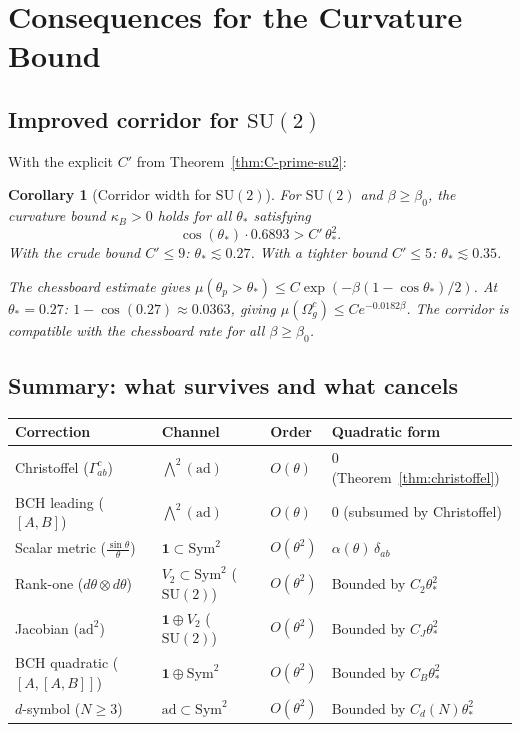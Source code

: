 \documentclass[11pt,a4paper]{article}
\theoremstyle{plain}
\newtheorem{corollary}[theorem]{Corollary}
\theoremstyle{definition}
\theoremstyle{remark}
\newcommand{\SU}{\mathrm{SU}}
\newcommand{\ad}{\mathrm{ad}}
\newcommand{\Sym}{\mathrm{Sym}}
\begin{document}
\section{Consequences for the Curvature Bound}\label{sec:applications}

\subsection{Improved corridor for $\SU(2)$}

With the explicit $C'$ from Theorem~\ref{thm:C-prime-su2}:

\begin{corollary}[Corridor width for $\SU(2)$]\label{cor:corridor-su2}
For $\SU(2)$ and $\beta \geq \beta_0$, the curvature bound
$\kappa_B > 0$ holds for all $\theta_*$ satisfying
\begin{equation}
\cos(\theta_*)\cdot 0.6893 > C'\,\theta_*^2.
\end{equation}
With the crude bound $C' \leq 9$: $\theta_* \lesssim 0.27$.
With a tighter bound $C' \leq 5$: $\theta_* \lesssim 0.35$.

The chessboard estimate gives
$\mu(\theta_p > \theta_*) \leq C\exp(-\beta(1-\cos\theta_*)/2)$.
At $\theta_* = 0.27$: $1 - \cos(0.27) \approx 0.0363$, giving
$\mu(\Omega_g^c) \leq Ce^{-0.0182\beta}$. The corridor is
compatible with the chessboard rate for all $\beta \geq \beta_0$.
\end{corollary}


\subsection{Summary: what survives and what cancels}

\begin{center}
\begin{tabular}{llll}
\toprule
Correction & Channel & Order & Quadratic form \\
\midrule
Christoffel ($\Gamma^c_{ab}$)
& $\bigwedge^2(\ad)$
& $O(\theta)$
& $0$ (Theorem~\ref{thm:christoffel}) \\[3pt]
BCH leading ($[A,B]$)
& $\bigwedge^2(\ad)$
& $O(\theta)$
& $0$ (subsumed by Christoffel) \\[3pt]
Scalar metric ($\frac{\sin\theta}{\theta}$)
& $\mathbf{1} \subset \Sym^2$
& $O(\theta^2)$
& $\alpha(\theta)\,\delta_{ab}$ \\[3pt]
Rank-one ($d\theta \otimes d\theta$)
& $V_2 \subset \Sym^2$ ($\SU(2)$)
& $O(\theta^2)$
& Bounded by $C_2\theta_*^2$ \\[3pt]
Jacobian ($\ad^2$)
& $\mathbf{1} \oplus V_2$ ($\SU(2)$)
& $O(\theta^2)$
& Bounded by $C_J\theta_*^2$ \\[3pt]
BCH quadratic ($[A,[A,B]]$)
& $\mathbf{1} \oplus \Sym^2$
& $O(\theta^2)$
& Bounded by $C_B\theta_*^2$ \\[3pt]
$d$-symbol ($N \geq 3$)
& $\ad \subset \Sym^2$
& $O(\theta^2)$
& Bounded by $C_d(N)\theta_*^2$ \\
\bottomrule
\end{tabular}
\end{center}
\end{document}

